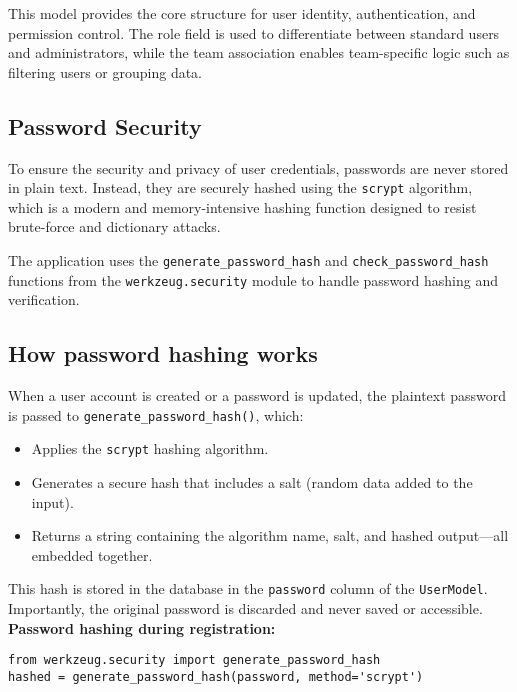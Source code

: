 \documentclass[12pt]{article}
\begin{document}
\noindent This model provides the core structure for user identity, authentication, and permission control. The role field is used to differentiate between standard users and administrators, while the team association enables team-specific logic such as filtering users or grouping data.


\subsection{Password Security}

To ensure the security and privacy of user credentials, passwords are never stored in plain text. Instead, they are securely hashed using the \texttt{scrypt} algorithm, which is a modern and memory-intensive hashing function designed to resist brute-force and dictionary attacks.

\noindent The application uses the \texttt{generate\_password\_hash} and \texttt{check\_password\_hash} functions from the \texttt{werkzeug.security} module to handle password hashing and verification.

\subsection*{How password hashing works}

When a user account is created or a password is updated, the plaintext password is passed to \texttt{generate\_password\_hash()}, which:
\begin{itemize}
  \item Applies the \texttt{scrypt} hashing algorithm.
  \item Generates a secure hash that includes a salt (random data added to the input).
  \item Returns a string containing the algorithm name, salt, and hashed output—all embedded together.
\end{itemize}

\noindent This hash is stored in the database in the \texttt{password} column of the \texttt{UserModel}. Importantly, the original password is discarded and never saved or accessible. \\

\noindent \textbf{Password hashing during registration:}
\begin{verbatim}
from werkzeug.security import generate_password_hash
hashed = generate_password_hash(password, method='scrypt')
\end{verbatim}
\end{document}
